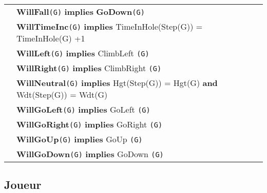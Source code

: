 \documentclass{article}
\begin{document}
\begin{tabular}{rl}
&\textbf{WillFall}\texttt{(G)} \textbf{implies} \textbf{GoDown}\texttt{(G)} \\

 &\textbf{WillTimeInc}\texttt{(G)} \textbf{implies} \textrm{TimeInHole(Step(G))} = \textrm{TimeInHole(G) +1}\\
 
& \textbf{WillLeft}\texttt{(G)}  \textbf{implies} \textrm{ClimbLeft} \texttt{(G)}\\ 

& \textbf{WillRight}\texttt{(G)}  \textbf{implies} \textrm{ClimbRight} \texttt{(G)}\\ 

& \textbf{WillNeutral}\texttt{(G)}  \textbf{implies} \textrm{Hgt(Step(G)) = Hgt(G)} \textbf{and} \textrm{Wdt(Step(G)) = Wdt(G)}\\ 

& \textbf{WillGoLeft}\texttt{(G)}  \textbf{implies} \textrm{GoLeft} \texttt{(G)}\\ 

& \textbf{WillGoRight}\texttt{(G)}  \textbf{implies} \textrm{GoRight} \texttt{(G)}\\ 

& \textbf{WillGoUp}\texttt{(G)}  \textbf{implies} \textrm{GoUp} \texttt{(G)}\\ 
& \textbf{WillGoDown}\texttt{(G)}  \textbf{implies} \textrm{GoDown} \texttt{(G)}\\ 

\end{tabular}

\newpage

\subsection*{Joueur}
\end{document}
